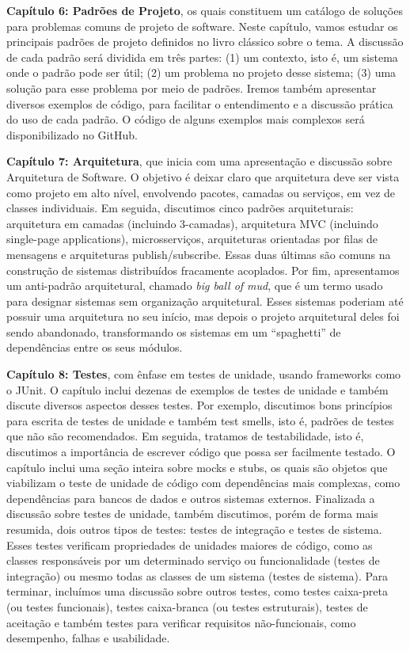 \documentclass[
  11pt,
  twoside]{book}
\begin{document}
\textbf{Capítulo 6: Padrões de Projeto}, os quais constituem um catálogo
de soluções para problemas comuns de projeto de software. Neste
capítulo, vamos estudar os principais padrões de projeto definidos no
livro clássico sobre o tema. A discussão de cada padrão será dividida em
três partes: (1) um contexto, isto é, um sistema onde o padrão pode ser
útil; (2) um problema no projeto desse sistema; (3) uma solução para
esse problema por meio de padrões. Iremos também apresentar diversos
exemplos de código, para facilitar o entendimento e a discussão prática
do uso de cada padrão. O código de alguns exemplos mais complexos será
disponibilizado no GitHub.

\textbf{Capítulo 7: Arquitetura}, que inicia com uma apresentação e
discussão sobre Arquitetura de Software. O objetivo é deixar claro que
arquitetura deve ser vista como projeto em alto nível, envolvendo
pacotes, camadas ou serviços, em vez de classes individuais. Em seguida,
discutimos cinco padrões arquiteturais: arquitetura em camadas
(incluindo 3-camadas), arquitetura MVC (incluindo single-page
applications), microsserviços, arquiteturas orientadas por filas de
mensagens e arquiteturas publish/subscribe. Essas duas últimas são
comuns na construção de sistemas distribuídos fracamente acoplados. Por
fim, apresentamos um anti-padrão arquitetural, chamado \emph{big ball of
mud}, que é um termo usado para designar sistemas sem organização
arquitetural. Esses sistemas poderiam até possuir uma arquitetura no seu
início, mas depois o projeto arquitetural deles foi sendo abandonado,
transformando os sistemas em um ``spaghetti'' de dependências entre os
seus módulos.

\textbf{Capítulo 8: Testes}, com ênfase em testes de unidade, usando
frameworks como o JUnit. O capítulo inclui dezenas de exemplos de testes
de unidade e também discute diversos aspectos desses testes. Por
exemplo, discutimos bons princípios para escrita de testes de unidade e
também test smells, isto é, padrões de testes que não são recomendados.
Em seguida, tratamos de testabilidade, isto é, discutimos a importância
de escrever código que possa ser facilmente testado. O capítulo inclui
uma seção inteira sobre mocks e stubs, os quais são objetos que
viabilizam o teste de unidade de código com dependências mais complexas,
como dependências para bancos de dados e outros sistemas externos.
Finalizada a discussão sobre testes de unidade, também discutimos, porém
de forma mais resumida, dois outros tipos de testes: testes de
integração e testes de sistema. Esses testes verificam propriedades de
unidades maiores de código, como as classes responsáveis por um
determinado serviço ou funcionalidade (testes de integração) ou mesmo
todas as classes de um sistema (testes de sistema). Para terminar,
incluímos uma discussão sobre outros testes, como testes caixa-preta (ou
testes funcionais), testes caixa-branca (ou testes estruturais), testes
de aceitação e também testes para verificar requisitos não-funcionais,
como desempenho, falhas e usabilidade.
\end{document}
